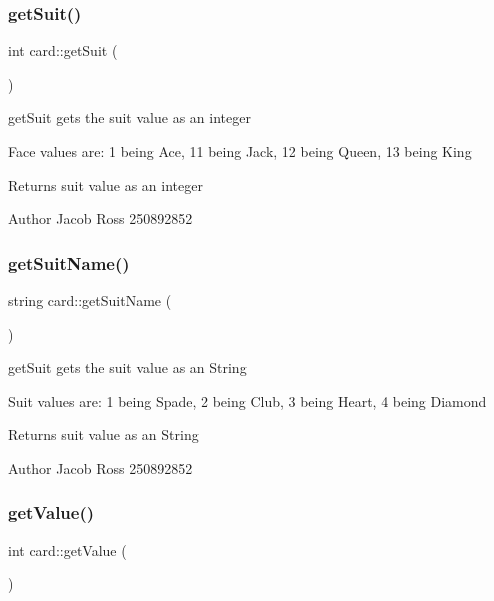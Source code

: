 \subsubsection{\texorpdfstring{get\+Suit()}{getSuit()}}
{\footnotesize\ttfamily int card\+::get\+Suit (\begin{DoxyParamCaption}{ }\end{DoxyParamCaption})}



get\+Suit gets the suit value as an integer 

Face values are\+: 1 being Ace, 11 being Jack, 12 being Queen, 13 being King \begin{DoxyReturn}{Returns}
suit value as an integer 
\end{DoxyReturn}
\begin{DoxyAuthor}{Author}
Jacob Ross 250892852 
\end{DoxyAuthor}
\mbox{\label{classcard_a1038b6c4a093a84ccdea7e3b191dcadd}} 
\subsubsection{\texorpdfstring{get\+Suit\+Name()}{getSuitName()}}
{\footnotesize\ttfamily string card\+::get\+Suit\+Name (\begin{DoxyParamCaption}{ }\end{DoxyParamCaption})}



get\+Suit gets the suit value as an String 

Suit values are\+: 1 being Spade, 2 being Club, 3 being Heart, 4 being Diamond \begin{DoxyReturn}{Returns}
suit value as an String 
\end{DoxyReturn}
\begin{DoxyAuthor}{Author}
Jacob Ross 250892852 
\end{DoxyAuthor}
\mbox{\label{classcard_a5cf12898a17ff2eda5469eaf857e286d}} 
\subsubsection{\texorpdfstring{get\+Value()}{getValue()}}
{\footnotesize\ttfamily int card\+::get\+Value (\begin{DoxyParamCaption}{ }\end{DoxyParamCaption})}



